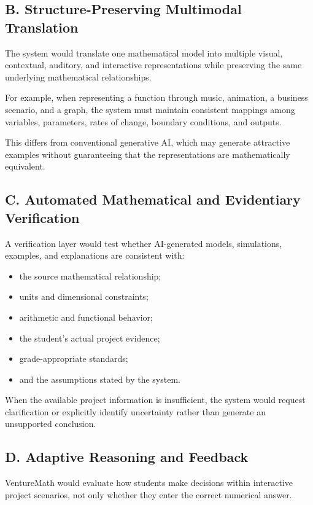 \subsection{B. Structure-Preserving Multimodal Translation}

The system would translate one mathematical model into multiple visual, contextual, auditory, and interactive representations while preserving the same underlying mathematical relationships.

For example, when representing a function through music, animation, a business scenario, and a graph, the system must maintain consistent mappings among variables, parameters, rates of change, boundary conditions, and outputs.

This differs from conventional generative AI, which may generate attractive examples without guaranteeing that the representations are mathematically equivalent.

\subsection{C. Automated Mathematical and Evidentiary Verification}

A verification layer would test whether AI-generated models, simulations, examples, and explanations are consistent with:
\begin{itemize}
    \item the source mathematical relationship;
\item units and dimensional constraints;
\item arithmetic and functional behavior;
\item the student’s actual project evidence;
\item grade-appropriate standards;
\item and the assumptions stated by the system.
\end{itemize}


When the available project information is insufficient, the system would request clarification or explicitly identify uncertainty rather than generate an unsupported conclusion.

\subsection{D. Adaptive Reasoning and Feedback}

VentureMath would evaluate how students make decisions within interactive project scenarios, not only whether they enter the correct numerical answer.

